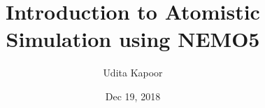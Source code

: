 \documentclass[microe]{ritthesis}
\author{Udita Kapoor}
\title{Introduction to Atomistic Simulation using NEMO5}
\date{Dec 19, 2018}
\begin{document}
	
\frontmatter



\begin{acknowledgments}
\lipsum[4-6]
\end{acknowledgments}

\begin{dedication}

\end{dedication}

\begin{abstract}
\lipsum[1-2]

\end{abstract}

\makealllists
\end{document}
